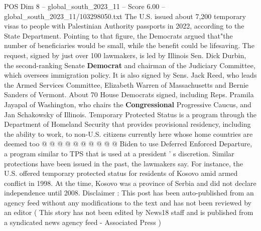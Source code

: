 \begin{textsample}{POS Dim 8 – global\_south\_2023\_11 – Score 6.00 – global\_south\_2023\_11/103298050.txt}
The U.S. issued about 7,200 temporary visas to people with Palestinian Authority passports in 2022, according to the State Department.
Pointing to that figure, the Democrats argued that"the number of beneficiaries would be small, while the benefit could be lifesaving.
The request, signed by just over 100 lawmakers, is led by Illinois Sen.
Dick Durbin, the second-ranking Senate \textbf{Democrat} and chairman of the Judiciary Committee, which oversees immigration policy.
It is also signed by Sens.
Jack Reed, who leads the Armed Services Committee, Elizabeth Warren of Massachusetts and Bernie Sanders of Vermont.
About 70 House Democrats signed, including Reps.
Pramila Jayapal of Washington, who chairs the \textbf{Congressional} Progressive Caucus, and Jan Schakowsky of Illinois.
Temporary Protected Status is a program through the Department of Homeland Security that provides provisional residency, including the ability to work, to non-U.S. citizens currently here whose home countries are deemed too @ @ @ @ @ @ @ @ @ @ Biden to use Deferred Enforced Departure, a program similar to TPS that is used at a president ' s discretion.
Similar protections have been issued in the past, the lawmakers say.
For instance, the U.S. offered temporary protected status for residents of Kosovo amid armed conflict in 1998.
At the time, Kosovo was a province of Serbia and did not declare independence until 2008.
Disclaimer : This post has been auto-published from an agency feed without any modifications to the text and has not been reviewed by an editor ( This story has not been edited by News18 staff and is published from a syndicated news agency feed - Associated Press )

\end{textsample}
